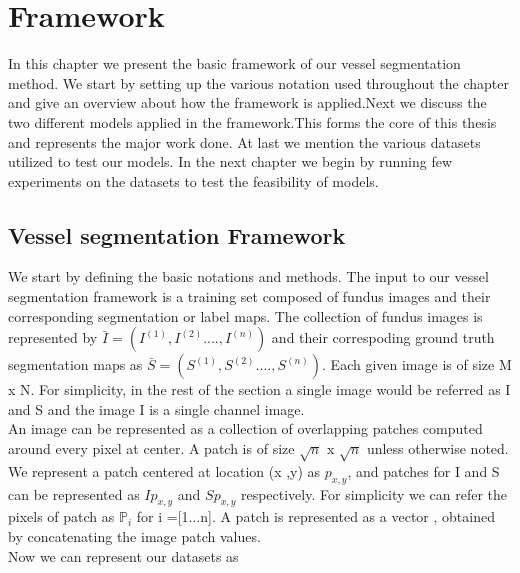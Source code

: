\chapter{Framework}

\ifpdf
    \graphicspath{{Chapter3/Figs/Raster/}{Chapter3/Figs/PDF/}{Chapter3/Figs/}}
\else
    \graphicspath{{Chapter3/Figs/Vector/}{Chapter3/Figs/}}
\fi
In this chapter we present the basic framework of our vessel segmentation method. We start by setting up the various notation used throughout the chapter and give an overview about how the framework is applied.Next we discuss the two different models applied in the framework.This forms the core of this thesis and represents the major work done. At last we mention the various datasets utilized to test our models. In the next chapter we begin by running few experiments on the datasets to test the feasibility of models.\\
\section{Vessel segmentation Framework}
We start by defining the basic notations and methods. The input to our vessel segmentation framework is a training set composed of fundus images and their corresponding segmentation or label maps. The collection of fundus images is represented by $\bar{I} = (I^{(1)},I^{(2)}...., I^{(n)} )$  and their correspoding ground truth segmentation maps as $\bar{S} = (S^{(1)},S^{(2)}...., S^{(n)} )$. Each given image is of size M x N.
For simplicity, in the rest of the section a single image would be referred as I and S and the image I is a single channel image.\\

An image can be represented as a collection of overlapping patches computed around every pixel at center. A patch is of size $\sqrt{n}$ x $\sqrt{n}$ unless otherwise noted. We represent a patch centered at location (x ,y) as $p_{x,y}$, and patches for I and S can be represented as $Ip_{x,y}$ and $Sp_{x,y}$ respectively. For simplicity we can refer the pixels of patch as $\mathbb{P}_i$ for i =[1...n]. A patch is represented as a vector , obtained by concatenating the image patch values.\\

Now we can represent our datasets as 

